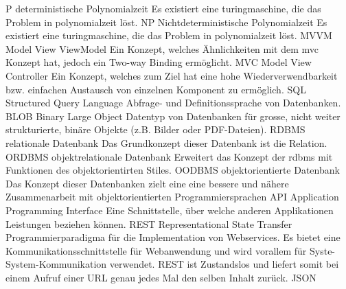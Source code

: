   {P}               %
  {deterministische Polynomialzeit}  %
  {Es existiert eine  \gls{turingmaschine}, die das Problem in \gls{polynomialzeit} löst.}
  {NP}               %
  {Nichtdeterministische Polynomialzeit}  %
  {Es existiert eine  \gls{turingmaschine}, die das Problem in \gls{polynomialzeit} löst.}
  {MVVM}               %
  {Model View ViewModel}  %
  {Ein Konzept, welches Ähnlichkeiten mit dem \gls{mvc} Konzept hat, jedoch ein Two-way Binding ermöglicht.}
  {MVC}               %
  {Model View Controller}  %
  {Ein Konzept, welches zum Ziel hat eine hohe Wiederverwendbarkeit bzw. einfachen Austausch von einzelnen Komponent zu ermöglich.}  
  {SQL}               %
  {Structured Query Language}  %
  {Abfrage- und Definitionssprache von Datenbanken.}
  {BLOB}               %
  {Binary Large Object}  %
  {Datentyp von Datenbanken für grosse, nicht weiter strukturierte, binäre Objekte (z.B. Bilder oder PDF-Dateien).}
  {RDBMS}               %
  {relationale Datenbank}  %
  {Das Grundkonzept dieser Datenbank ist die Relation.}
  {ORDBMS}               %
  {objektrelationale Datenbank}  %
  {Erweitert das Konzept der \gls{rdbms} mit Funktionen des objektorientirten Stiles.}
  {OODBMS}               %
  {objektorientierte Datenbank}  %
  {Das Konzept dieser Datenbanken zielt eine eine bessere und nähere Zusammenarbeit mit objektorientierten Programmiersprachen}
  {API}               %
  {Application Programming Interface}
  {Eine Schnittstelle, über welche anderen Applikationen Leistungen beziehen können.}
  {REST}               %
  {Representational State Transfer}
  {Programmierparadigma für die Implementation von Webservices. Es bietet eine Kommunikationsschnittstelle für Webanwendung und 
wird vorallem für Syste-System-Kommunikation verwendet. REST ist Zustandslos und liefert somit bei einem Aufruf einer URL genau 
jedes Mal den selben Inhalt zurück.}
  {JSON}               %
